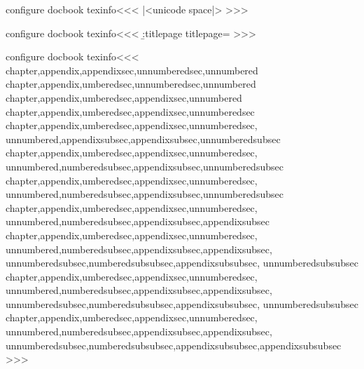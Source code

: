 \<configure docbook texinfo\><<<
|<unicode space|>
>>>






\<configure docbook texinfo\><<<
  {\b:titlepage   \let\b:titlepage=\empty
   \ifvmode \IgnorePar \fi \EndP {}}
  {\ifvmode \IgnorePar \fi \EndP {}}
>>>




\<configure docbook texinfo\><<<
   {chapter,appendix,appendixsec,unnumberedsec,unnumbered}
   {chapter,appendix,umberedsec,unnumberedsec,unnumbered}
   {chapter,appendix,umberedsec,appendixsec,unnumbered}
   {chapter,appendix,umberedsec,appendixsec,unnumberedsec}
   {chapter,appendix,umberedsec,appendixsec,unnumberedsec,%
    unnumbered,appendixsubsec,appendixsubsec,unnumberedsubsec}
   {chapter,appendix,umberedsec,appendixsec,unnumberedsec,%
    unnumbered,numberedsubsec,appendixsubsec,unnumberedsubsec}
   {chapter,appendix,umberedsec,appendixsec,unnumberedsec,%
    unnumbered,numberedsubsec,appendixsubsec,unnumberedsubsec}
   {chapter,appendix,umberedsec,appendixsec,unnumberedsec,%
    unnumbered,numberedsubsec,appendixsubsec,appendixsubsec}
   {chapter,appendix,umberedsec,appendixsec,unnumberedsec,%
    unnumbered,numberedsubsec,appendixsubsec,appendixsubsec,%
    unnumberedsubsec,numberedsubsubsec,appendixsubsubsec,%
    unnumberedsubsubsec}
   {chapter,appendix,umberedsec,appendixsec,unnumberedsec,%
    unnumbered,numberedsubsec,appendixsubsec,appendixsubsec,%
    unnumberedsubsec,numberedsubsubsec,appendixsubsubsec,%
    unnumberedsubsubsec}
   {chapter,appendix,umberedsec,appendixsec,unnumberedsec,%
    unnumbered,numberedsubsec,appendixsubsec,appendixsubsec,%
    unnumberedsubsec,numberedsubsubsec,appendixsubsubsec,appendixsubsubsec}
>>>









